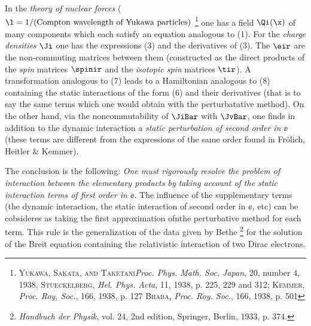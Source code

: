 \documentclass{article}
\renewcommand{\it}[1]{\textit{#1}}
\begin{document}
In the \it{theory of nuclear forces} ($\l = 1/(\text{Compton wavelength of Yukawa particles})$ \footnote{\textsc{Yukawa, Sakata, and Taketani}\it{Proc. Phys. Math. Soc. Japan}, 20, number 4, 1938, \textsc{Stueckelberg}, \it{Hel. Phys. Acta}, 11, 1938, p. 225, 229 and 312; \textsc{Kemmer}, \textit{Proc. Roy, Soc.}, 166, 1938, p. 127 \textsc{Bhaba}, \textit{Proc. Roy. Soc.}, 166, 1938, p. 501} one has a field $\Qi(\x)$ of many components which each satisfy an equation analogous to (1). For the \it{charge densities} $\Ji$ one has the expressions (3) and the derivatives of (3). The $\eir$ are the non-commuting matrices between them (constructed as the direct products of the \it{spin} matrices $\spinir$ and the \it{isotopic spin} matrices $\tir$). A transformation analogous to (7) leads to a Hamiltonian analogous to (8) containing the static interactions of the form (6) and their derivatives (that is to say the same terms which one would obtain with the perturbatative method). On the other hand, via the noncommutability of $\JiBar$ with $\JvBar$, one finds in addition to the dynamic interaction a \it{static perturbation of second order in $\ee$} (these terms are different from the expressions of the same order found in Frölich, Heitler \& Kemmer).

The conclusion is the following:
\it{One must rigorously resolve the problem of interaction between the elementary products by taking account of the static interaction terms of first order in $\ee$}. The influence of the supplementary terms (the dynamic interaction, the static interaction of second order in $\ee$, etc) can be cobsideres as taking the first approximation ofnthe perturbative method for each term.
This rule is the generalization of the data given by Bethe \footnote{\it{Handbuch der Physik}, vol. 24, 2nd edition, Springer, Berlin, 1933, p. 374.} for the solution of the Breit equation containing the relativistic interaction of two Dirac electrons.
\end{document}
